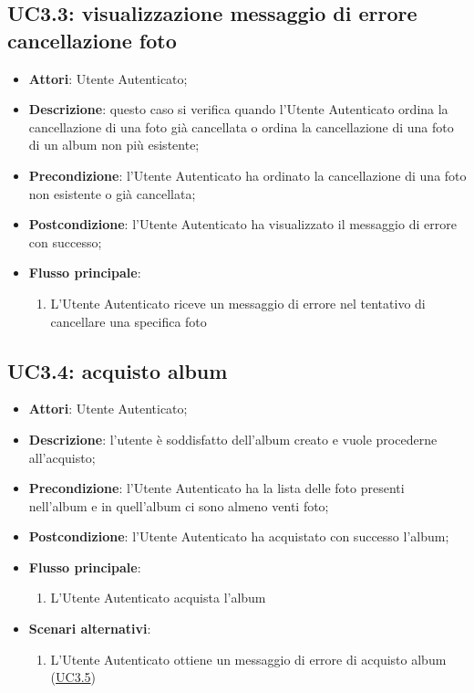 
\subsection{UC3.3: visualizzazione messaggio di errore cancellazione foto}
\label{uc:uc3.3}
\hypertarget{UC3.3}{}

\begin{itemize}
  \item \textbf{Attori}: Utente Autenticato;
  \item \textbf{Descrizione}: questo caso si verifica quando l'Utente
Autenticato ordina la cancellazione di una foto già cancellata o ordina la
cancellazione di una foto di un album non più esistente;
  \item \textbf{Precondizione}: l'Utente Autenticato ha ordinato la
cancellazione di una foto non esistente o già cancellata;
  \item \textbf{Postcondizione}: l'Utente Autenticato ha visualizzato il
messaggio di errore con successo;
  \item \textbf{Flusso principale}:
  \begin{enumerate}
    \item L'Utente Autenticato riceve un messaggio di errore nel tentativo di
cancellare una specifica foto
  \end{enumerate}
\end{itemize}



\subsection{UC3.4: acquisto album}
\label{uc:uc3.4}
\hypertarget{UC3.4}{}

\begin{itemize}
  \item \textbf{Attori}: Utente Autenticato;
  \item \textbf{Descrizione}: l'utente è soddisfatto dell'album creato e vuole
procederne all'acquisto;
  \item \textbf{Precondizione}: l'Utente Autenticato ha la lista delle foto
presenti nell'album e in quell'album ci sono almeno venti foto;
  \item \textbf{Postcondizione}: l'Utente Autenticato ha acquistato con
successo l'album;
  \item \textbf{Flusso principale}:
  \begin{enumerate}
    \item L'Utente Autenticato acquista l'album
  \end{enumerate}
  \item \textbf{Scenari alternativi}:
  \begin{enumerate}
    \item L'Utente Autenticato ottiene un messaggio di errore di acquisto album
(\hyperlink{UC3.5}{UC3.5})
  \end{enumerate}
\end{itemize}

